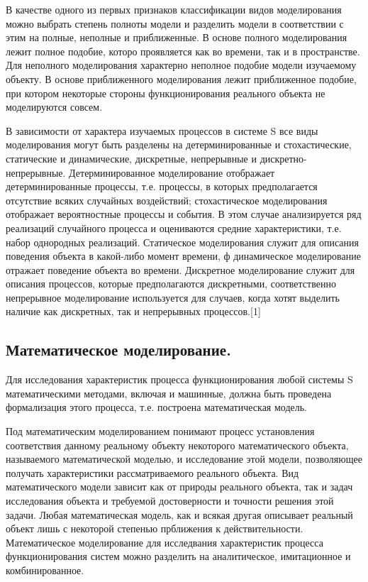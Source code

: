  В качестве одного из первых признаков классификации видов моделирования можно выбрать степень полноты модели и разделить модели в соответствии с этим на полные, неполные и приближенные. В основе полного моделирования лежит полное подобие, которо проявляется как во времени, так и в пространстве. Для неполного моделирования характерно неполное подобие модели изучаемому объекту. В основе приближенного моделирования лежит приближенное подобие, при котором некоторые стороны функционирования реального объекта не моделируются совсем.

    В зависимости от характера изучаемых процессов в системе S все виды моделирования могут быть разделены на детерминированные и стохастические, статические и динамические, дискретные, непрерывные и дискретно-непрерывные. Детерминированное моделирование отображает детерминированные процессы, т.е. процессы, в которых предполагается отсутствие всяких случайных воздействий; стохастическое моделирования отображает вероятностные процессы и события. В этом случае анализируется ряд реализаций случайного процесса и оцениваются средние характеристики, т.е. набор однородных реализаций. Статическое моделирования служит для описания поведения объекта в какой-либо момент времени, ф динамическое моделирование отражает поведение объекта во времени. Дискретное моделирование служит для описания процессов, которые предполагаются дискретными, соответственно непрерывное моделирование используется для случаев, когда хотят выделить наличие как дискретных, так и непрерывных процессов.[1]


\subsection{Математическое моделирование.}

 Для исследования характеристик процесса функционирования любой системы S математическими методами, включая и машинные, должна быть проведена формализация этого процесса, т.е. построена математическая модель.

    Под математическим моделированием понимают процесс установления соответствия данному реальному объекту некоторого математического объекта, называемого математической моделью, и исследование этой модели, позволяющее получать характеристики рассматриваемого реального объекта. Вид математического модели зависит как от природы реального объекта, так и задач исследования объекта и требуемой достоверности и точности решения этой задачи. Любая математическая модель, как и всякая другая описывает реальный объект лишь с некоторой степенью прближения к действительности. Математическое моделирование для исследвания характеристик процесса функционирования систем можно разделить на аналитическое, имитационное и комбинированное.

